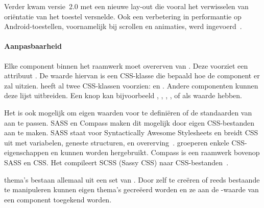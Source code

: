 Verder kwam versie~2.0 met een nieuwe lay-out  die vooral het verwisselen van oriëntatie van het toestel versnelde.  
Ook een verbetering in performantie op Android-toestellen,  voornamelijk bij scrollen en animaties,  werd ingevoerd~\cite{Inc.}.



\paragraph{Aanpasbaarheid}
\label{sec:sencha-aanpasbaarheid}
Elke component binnen het raamwerk moet overerven van .  
Deze voorziet een attribuut .  
De waarde hiervan is een CSS-klasse die bepaald hoe de component er zal uitzien.  
\st{} heeft al twee CSS-klassen voorzien:   en .  
Andere componenten kunnen deze lijst uitbreiden.  
Een knop kan bijvoorbeeld ,  ,  ,  ,   of  als  waarde hebben.

Het is ook mogelijk om eigen waarden voor  te definiëren of de standaarden van \st{} aan te passen.  
SASS en Compass maken dit mogelijk door eigen CSS-bestanden aan te maken.  
SASS staat voor Syntactically Awesome Stylesheets en breidt CSS uit met variabelen,  geneste structuren,  en overerving~\cite{Eppstein2013}.  
 groeperen enkele CSS-eigenschappen en kunnen worden hergebruikt.  
Compass is een raamwerk bovenop SASS en CSS.  
Het compileert SCSS (Sassy CSS) naar CSS-bestanden~\cite{Eppstein2013a}.        

\st{} thema's bestaan allemaal uit een set van .  
Door zelf  te creëren of reeds bestaande te manipuleren kunnen eigen thema's gecreëerd worden en ze aan de -waarde van een component toegekend worden.

